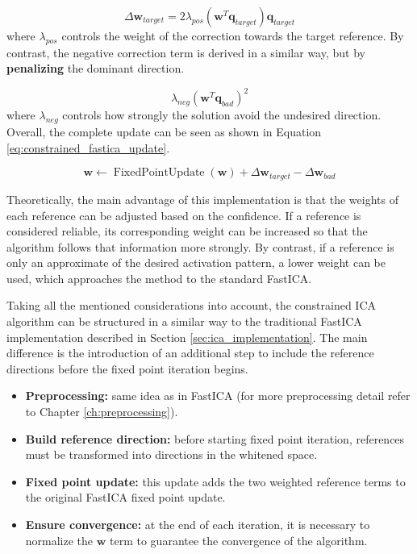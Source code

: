 \begin{equation}
\Delta \mathbf{w}_{target}
=
2\lambda_{pos}
\left(
\mathbf{w}^{T}\mathbf{q}_{target}
\right)
\mathbf{q}_{target}
\label{eq:positive_correction}
\end{equation}
where $\lambda_{pos}$ controls the weight of the correction towards the target reference. By contrast, the negative correction term is derived in a similar way, but by \textbf{penalizing} the dominant direction. 

\begin{equation}
\lambda_{neg}
\left(
\mathbf{w}^{T}\mathbf{q}_{bad}
\right)^2
\label{eq:negative_soft_constraint}
\end{equation}
where $\lambda_{neg}$ controls how strongly the solution avoid the undesired direction. Overall, the complete update can be seen as shown in Equation \ref{eq:constrained_fastica_update}. 

\begin{equation}
\mathbf{w}
\leftarrow
\operatorname{FixedPointUpdate}(\mathbf{w})
+
\Delta \mathbf{w}_{target}
-
\Delta \mathbf{w}_{bad}
\label{eq:constrained_fastica_update}
\end{equation}



Theoretically, the main advantage of this implementation is that the weights of each reference can be adjusted based on the confidence. If a reference is considered reliable, its corresponding weight can be increased so that the algorithm follows that information more strongly. By contrast, if a reference is only an approximate of the desired activation pattern, a lower weight can be used, which approaches the method to the standard FastICA.

Taking all the mentioned considerations into account, the constrained ICA algorithm can be structured in a similar way to the traditional FastICA implementation described in Section \ref{sec:ica_implementation}. The main difference is the introduction of an additional step to include the reference directions before the fixed point iteration begins. 

\begin{itemize}
    \item \textbf{Preprocessing:} same idea as in FastICA (for more preprocessing detail refer to Chapter \ref{ch:preprocessing}).
    \item \textbf{Build reference direction: }before starting fixed point iteration, references must be transformed into directions in the whitened space.  
    \item \textbf{Fixed point update: }this update adds the two weighted reference terms to the original FastICA fixed point update.
    \item \textbf{Ensure convergence: }at the end of each iteration, it is necessary to normalize the $\mathbf{w}$ term to guarantee the convergence of the algorithm.
    
\end{itemize}

